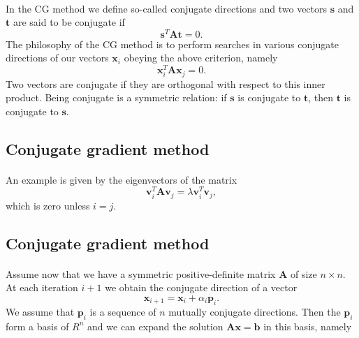 \documentclass[%
oneside,                 %
final,                   %
10pt]{article}
\begin{document}
\paragraph{}
In the CG method we define so-called conjugate directions and two vectors 
$\bm{s}$ and $\bm{t}$
are said to be
conjugate if
\begin{equation*}
\bm{s}^T\bm{A}\bm{t}= 0.
\end{equation*}
The philosophy of the CG method is to perform searches in various conjugate directions
of our vectors $\bm{x}_i$ obeying the above criterion, namely
\begin{equation*}
\bm{x}_i^T\bm{A}\bm{x}_j= 0.
\end{equation*}
Two vectors are conjugate if they are orthogonal with respect to 
this inner product. Being conjugate is a symmetric relation: if $\bm{s}$ is conjugate to $\bm{t}$, then $\bm{t}$ is conjugate to $\bm{s}$.



\subsection*{Conjugate gradient method}

\paragraph{}
An example is given by the eigenvectors of the matrix
\begin{equation*}
\bm{v}_i^T\bm{A}\bm{v}_j= \lambda\bm{v}_i^T\bm{v}_j,
\end{equation*}
which is zero unless $i=j$.




\subsection*{Conjugate gradient method}

\paragraph{}
Assume now that we have a symmetric positive-definite matrix $\bm{A}$ of size
$n\times n$. At each iteration $i+1$ we obtain the conjugate direction of a vector
\begin{equation*}
\bm{x}_{i+1}=\bm{x}_{i}+\alpha_i\bm{p}_{i}. 
\end{equation*}
We assume that $\bm{p}_{i}$ is a sequence of $n$ mutually conjugate directions. 
Then the $\bm{p}_{i}$  form a basis of $R^n$ and we can expand the solution 
$  \bm{A}\bm{x} = \bm{b}$ in this basis, namely
\end{document}
